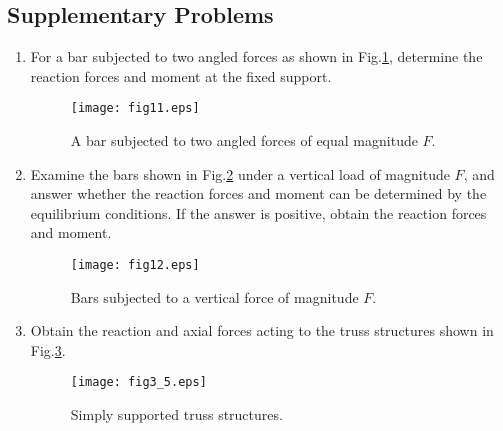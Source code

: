 ﻿\documentclass[10pt,a4j]{article}
\begin{document}
\subsection{Supplementary Problems}
\begin{enumerate}
\item
For a bar subjected to two angled forces as shown in Fig.\ref{fig:fig11}, 
determine the reaction forces and moment at the fixed support.
\begin{figure}[h]
	\begin{center}
	\texttt{[image: fig11.eps]} 
	\end{center}
	\caption{A bar subjected to two angled forces of equal magnitude $F$.}
	\label{fig:fig11}
\end{figure}
\item
	Examine the bars shown in Fig.\ref{fig:fig12} under a vertical load 
	of magnitude $F$, and answer whether the reaction forces and 
	moment can be determined by the equilibrium conditions.
	If the answer is positive, obtain the reaction forces and moment. 
\begin{figure}[h]
	\begin{center}
	\texttt{[image: fig12.eps]} 
	\end{center}
	\caption{Bars subjected to a vertical force of magnitude $F$.} 
	\label{fig:fig12}
\end{figure}
\item
Obtain the reaction and axial forces acting to the truss structures shown in Fig.\ref{fig:fig3_5}.
\begin{figure}[h]
	\begin{center}
	\texttt{[image: fig3\_5.eps]} 
	\end{center}
	\caption{Simply supported truss structures.} 
	\label{fig:fig3_5}
\end{figure}
\end{enumerate}
\end{document}
